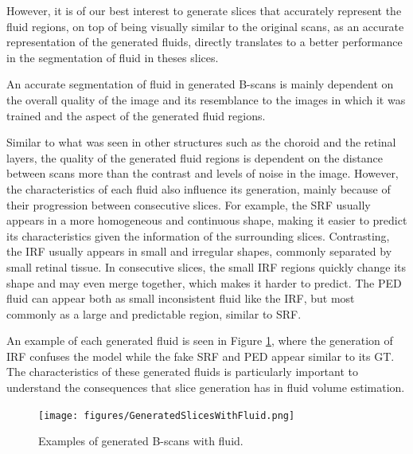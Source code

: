 However, it is of our best interest to generate slices that accurately represent the fluid regions, on top of being visually similar to the original scans, as an accurate representation of the generated fluids, directly translates to a better performance in the segmentation of fluid in theses slices. 
\par
An accurate segmentation of fluid in generated B-scans is mainly dependent on the overall quality of the image and its resemblance to the images in which it was trained and the aspect of the generated fluid regions.
\par
Similar to what was seen in other structures such as the choroid and the retinal layers, the quality of the generated fluid regions is dependent on the distance between scans more than the contrast and levels of noise in the image. However, the characteristics of each fluid also influence its generation, mainly because of their progression between consecutive slices. For example, the SRF usually appears in a more homogeneous and continuous shape, making it easier to predict its characteristics given the information of the surrounding slices. Contrasting, the IRF usually appears in small and irregular shapes, commonly separated by small retinal tissue. In consecutive slices, the small IRF regions quickly change its shape and may even merge together, which makes it harder to predict. The PED fluid can appear both as small inconsistent fluid like the IRF, but most commonly as a large and predictable region, similar to SRF.
\par
An example of each generated fluid is seen in Figure \ref{fig:GeneratedSlicesWithFluid}, where the generation of IRF confuses the model while the fake SRF and PED appear similar to its GT. The characteristics of these generated fluids is particularly important to understand the consequences that slice generation has in fluid volume estimation.

\begin{figure}[!ht]
	\centering	\texttt{[image: figures/GeneratedSlicesWithFluid.png]}
	\caption{Examples of generated B-scans with fluid.}
	\label{fig:GeneratedSlicesWithFluid}
\end{figure}

